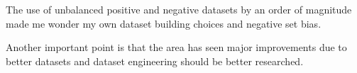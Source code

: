 \documentclass[
10pt, %
a4paper, %
onecolumn, %
]{article}
\begin{document}
The use of unbalanced positive and negative datasets by an order of magnitude made me wonder my own dataset building choices and negative set bias. 

Another important point is that the area has seen major improvements due to better datasets and dataset engineering should be better researched. 

%
%

\renewcommand{\refname}{References} %


\end{document}
